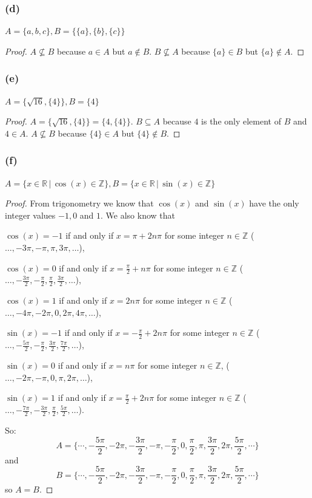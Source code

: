 \documentclass[14pt]{extarticle}
\newcommand{\R}{\mathbb{R}}
\newcommand{\Z}{\mathbb{Z}}
\begin{document}
\subsubsection{(d)}
\(A = \{a, b, c\}, B = \{\{a\}, \{b\}, \{c\}\}\)

\begin{proof}
\(A \nsubseteq B\) because $a \in A$ but $a \notin B$.
\(B \nsubseteq A\) because $\{a\} \in B$ but $\{a\} \notin A$.
\end{proof}

\subsubsection{(e)}
\(A = \{\sqrt{16}, \{4\}\}, B = \{4\}\)

\begin{proof}
\(A = \{\sqrt{16}, \{4\}\} = \{4, \{4\}\}\). 
\(B \subseteq A\) because $4$ is the only element of $B$ and $4 \in A$.
\(A \nsubseteq B\) because \(\{4\} \in A\) but \(\{4\} \notin B\).
\end{proof}

\subsubsection{(f)}
\(A = \{x \in \R \, | \, \cos(x) \in \Z\}, B = \{x \in \R \, | \, \sin(x) \in \Z\}\)

\begin{proof}
From trigonometry we know that \(\cos(x)\) and \(\sin(x)\) have the only integer values $-1, 0$ and $1$. We also know that 

\(\cos(x) = -1\) if and only if \(x = \pi + 2n\pi\) for some integer $n \in \Z$ 
(\(\ldots, -3\pi, -\pi, \pi, 3\pi, \ldots\)),

\(\cos(x) = 0\) if and only if \(x = \frac{\pi}{2} + n\pi\) for some integer $n \in \Z$ 
(\(\ldots, -\frac{3\pi}{2}, -\frac{\pi}{2}, \frac{\pi}{2}, \frac{3\pi}{2}, \ldots\)),

\(\cos(x) = 1\) if and only if \(x = 2n\pi\) for some integer $n \in \Z$ 
(\(\ldots, -4\pi, -2\pi, 0, 2\pi, 4\pi, \ldots\)),

\(\sin(x) = -1\) if and only if \(x = -\frac{\pi}{2} + 2n\pi\) for some integer $n \in \Z$
(\(\ldots, -\frac{5\pi}{2}, -\frac{\pi}{2}, \frac{3\pi}{2}, \frac{7\pi}{2}, \ldots\)),

\(\sin(x) = 0\) if and only if \(x = n\pi\) for some integer $n \in \Z$,
(\(\ldots, -2\pi, -\pi, 0, \pi, 2\pi, \ldots\)),

\(\sin(x) = 1\) if and only if \(x = \frac{\pi}{2} + 2n\pi\) for some integer $n \in \Z$
(\(\ldots, -\frac{7\pi}{2}, -\frac{3\pi}{2}, \frac{\pi}{2}, \frac{5\pi}{2}, \ldots\)).

So:
\[
A = \{\cdots, -\frac{5\pi}{2}, -2\pi, -\frac{3\pi}{2}, -\pi, -\frac{\pi}{2}, 0, \frac{\pi}{2}, \pi, \frac{3\pi}{2}, 2\pi, \frac{5\pi}{2}, \cdots\}
\]
and
\[
B = \{\cdots, -\frac{5\pi}{2}, -2\pi, -\frac{3\pi}{2}, -\pi, -\frac{\pi}{2}, 0, \frac{\pi}{2}, \pi, \frac{3\pi}{2}, 2\pi, \frac{5\pi}{2}, \cdots\}
\]
so $A = B$.
\end{proof}
\end{document}
